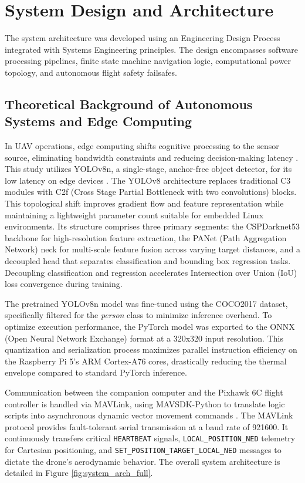 \documentclass[conference]{IEEEtran}
\begin{document}
\section{System Design and Architecture}
The system architecture was developed using an Engineering Design Process integrated with Systems Engineering principles. The design encompasses software processing pipelines, finite state machine navigation logic, computational power topology, and autonomous flight safety failsafes.

\subsection{Theoretical Background of Autonomous Systems and Edge Computing}
In UAV operations, edge computing shifts cognitive processing to the sensor source, eliminating bandwidth constraints and reducing decision-making latency \cite{b16}. This study utilizes YOLOv8n, a single-stage, anchor-free object detector, for its low latency on edge devices \cite{b11}. The YOLOv8 architecture replaces traditional C3 modules with C2f (Cross Stage Partial Bottleneck with two convolutions) blocks. This topological shift improves gradient flow and feature representation while maintaining a lightweight parameter count suitable for embedded Linux environments. Its structure comprises three primary segments: the CSPDarknet53 backbone for high-resolution feature extraction, the PANet (Path Aggregation Network) neck for multi-scale feature fusion across varying target distances, and a decoupled head that separates classification and bounding box regression tasks. Decoupling classification and regression accelerates Intersection over Union (IoU) loss convergence during training.

The pretrained YOLOv8n model was fine-tuned using the COCO2017 dataset, specifically filtered for the \textit{person} class to minimize inference overhead. To optimize execution performance, the PyTorch model was exported to the ONNX (Open Neural Network Exchange) format at a 320x320 input resolution. This quantization and serialization process maximizes parallel instruction efficiency on the Raspberry Pi 5's ARM Cortex-A76 cores, drastically reducing the thermal envelope compared to standard PyTorch inference. 

Communication between the companion computer and the Pixhawk 6C flight controller is handled via MAVLink, using MAVSDK-Python to translate logic scripts into asynchronous dynamic vector movement commands \cite{b12, b13}. The MAVLink protocol provides fault-tolerant serial transmission at a baud rate of 921600. It continuously transfers critical \texttt{HEARTBEAT} signals, \texttt{LOCAL\_POSITION\_NED} telemetry for Cartesian positioning, and \texttt{SET\_POSITION\_TARGET\_LOCAL\_NED} messages to dictate the drone's aerodynamic behavior. The overall system architecture is detailed in Figure \ref{fig:system_arch_full}.
\end{document}
